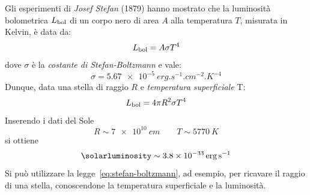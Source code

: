 Gli esperimenti di \emph{Josef Stefan} (1879) hanno mostrato che la luminosità bolometrica $L_\textup{bol}$ di un corpo nero di area $A$ alla temperatura $T$, misurata in Kelvin, è data da:
\[
    L_\textup{bol} = A \sigma T^4
\]
dove $\sigma$ è la \emph{costante di Stefan-Boltzmann} e vale:
\[
    \sigma = \SI{5.67e-5}{erg.s^{-1}.cm^{-2}.K^{-4}}
\]
Dunque, data una stella di raggio $R$ e \emph{temperatura superficiale} T:
\begin{equation}\label{eq:stefan-boltzmann}
    L_\textup{bol} = 4 \pi R^2 \sigma T^4
\end{equation}
Inserendo i dati del Sole
\[
    R \sim \SI{7e10}{cm} \qquad T \sim \SI{5770}{K}
\]
si ottiene
\[
    \si{\solarluminosity} \sim \SI{3.8e-33}{erg.s^{-1}}
\]
Si può utilizzare la legge~\eqref{eq:stefan-boltzmann}, ad esempio, per ricavare il raggio di una stella, conoscendone la temperatura superficiale e la luminosità.